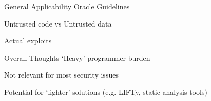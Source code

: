 \begin{frame}{General Applicability}
	Oracle Guidelines
	
	Untrusted code vs Untrusted data
	
	Actual exploits
\end{frame}

\begin{frame}{Overall Thoughts}
	`Heavy' programmer burden
	
	Not relevant for most security issues
	
	Potential for `lighter' solutions (e.g. LIFTy, static analysis tools)
\end{frame}